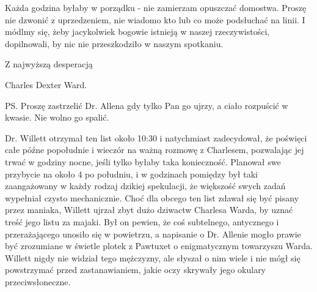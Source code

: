 \begin{displayquote}
Każda godzina byłaby w porządku - nie zamierzam opuszczać domostwa. Proszę nie dzwonić z uprzedzeniem, nie wiadomo kto lub co może podsłuchać na linii. I módlmy się, żeby jacykolwiek bogowie istnieją w naszej rzeczywistości, dopilnowali, by nic nie przeszkodziło w naszym spotkaniu.

Z najwyższą desperacją

\begin{flushright}
Charles Dexter Ward.
\end{flushright}

PS. Proszę zastrzelić Dr. Allena gdy tylko Pan go ujrzy, a ciało rozpuścić w kwasie. Nie wolno go spalić.
\end{displayquote}

Dr. Willett otrzymał ten list około 10:30 i natychmiast zadecydował, że poświęci całe późne popołudnie i wieczór na ważną rozmowę z Charlesem, pozwalając jej trwać w godziny nocne, jeśli tylko byłaby taka konieczność. Planował swe przybycie na około 4 po południu, i w godzinach pomiędzy był taki zaangażowany w każdy rodzaj dzikiej spekulacji, że większość swych zadań wypełniał czysto mechanicznie. Choć dla obcego ten list zdawał się być pisany przez maniaka, Willett ujrzał zbyt dużo dziwactw Charlesa Warda, by uznać treść jego listu za majaki. Był on pewien, że coś subtelnego, antycznego i przerażającego unosiło się w powietrzu, a napisanie o Dr. Allenie mogło prawie być zrozumiane w świetle plotek z Pawtuxet o enigmatycznym towarzyszu Warda. Willett nigdy nie widział tego mężczyzny, ale słyszał o nim wiele i nie mógł się powstrzymać przed zastanawianiem, jakie oczy skrywały jego okulary przeciwsłoneczne. 

